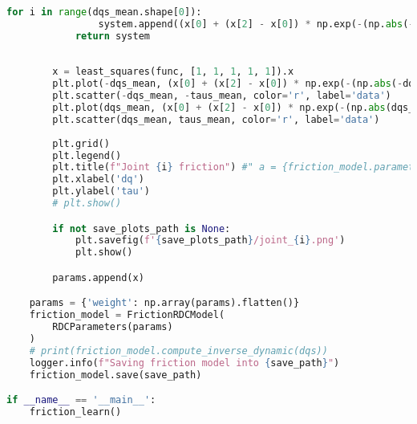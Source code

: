 \begin{lstlisting}[language=python, caption=\raggedright{identification/friction.py}, frame=single]
            for i in range(dqs_mean.shape[0]):
                system.append((x[0] + (x[2] - x[0]) * np.exp(-(np.abs(-dqs_mean[i] / x[3])**x[4]))) * np.sign(-dqs_mean[i]) + x[1] * -dqs_mean[i] + taus_mean[i])
            return system
        
        
        x = least_squares(func, [1, 1, 1, 1, 1]).x
        plt.plot(-dqs_mean, (x[0] + (x[2] - x[0]) * np.exp(-(np.abs(-dqs_mean / x[3])**x[4]))) * np.sign(-dqs_mean) + x[1] * -dqs_mean, color='b')
        plt.scatter(-dqs_mean, -taus_mean, color='r', label='data')
        plt.plot(dqs_mean, (x[0] + (x[2] - x[0]) * np.exp(-(np.abs(dqs_mean / x[3])**x[4]))) * np.sign(dqs_mean) + x[1] * dqs_mean, color='b')
        plt.scatter(dqs_mean, taus_mean, color='r', label='data')
        
        plt.grid()
        plt.legend()
        plt.title(f"Joint {i} friction") #" a = {friction_model.parameters.raw['weight'][1]}, b = {friction_model.parameters.raw['weight'][0]}")
        plt.xlabel('dq')
        plt.ylabel('tau')
        # plt.show()

        if not save_plots_path is None:
            plt.savefig(f'{save_plots_path}/joint_{i}.png')
            plt.show()

        params.append(x)

    params = {'weight': np.array(params).flatten()}
    friction_model = FrictionRDCModel(
        RDCParameters(params)
    )
    # print(friction_model.compute_inverse_dynamic(dqs))
    logger.info(f"Saving friction model into {save_path}")
    friction_model.save(save_path)

if __name__ == '__main__':
    friction_learn()

\end{lstlisting}